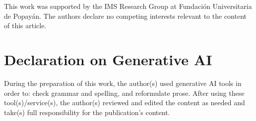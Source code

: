 \documentclass[]{ceurart}
\begin{document}
\begin{acknowledgments}
This work was supported by the IMS Research Group at Fundación Universitaria de
Popayán. The authors declare no competing interests relevant to the content of
this article.
\end{acknowledgments}

\section*{Declaration on Generative AI}
During the preparation of this work, the author(s) used generative AI tools in
order to: check grammar and spelling, and reformulate prose. After using these
tool(s)/service(s), the author(s) reviewed and edited the content as needed and
take(s) full responsibility for the publication's content.


\end{document}
